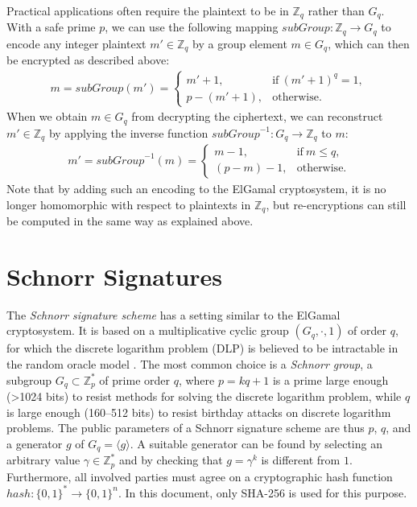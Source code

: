 \documentclass[bibtotoc,halfparskip,oneside]{scrreprt}
\begin{document}
	Practical applications often require the plaintext to be in $\mathbb{Z}_q$ rather than $G_q$. With a safe prime $p$, we can use the following mapping $\mathit{subGroup}:\mathbb{Z}_q\rightarrow G_q$ to encode any integer plaintext $m'\in\mathbb{Z}_q$ by a group element $m\in G_q$, which can then be encrypted as described above:
	\begin{align}
		m=\mathit{subGroup}(m')=
		\begin{cases}
			m'+1,&  \text{if}~ (m'+1)^q=1,\\
			p-(m'+1),&  \text{otherwise}.
		\end{cases}
	\end{align}
	When we obtain $m\in G_q$ from decrypting the ciphertext, we can reconstruct $m'\in\mathbb{Z}_q$ by applying the inverse function $\mathit{subGroup}^{-1}:G_q \rightarrow \mathbb{Z}_q$ to $m$:
	\begin{align}
		m'=\mathit{subGroup}^{-1}(m)=
		\begin{cases}
			m-1,&  \text{if}~ m \leq q,\\
			(p-m)-1,&  \text{otherwise}.
		\end{cases}
	\end{align}
	Note that by adding such an encoding to the ElGamal cryptosystem, it is no longer homomorphic with respect to plaintexts in $\mathbb{Z}_q$, but re-encryptions can still be computed in the same way as explained above.
	
	\section{Schnorr Signatures}\label{schnorrsig}
	
	The \emph{Schnorr signature scheme} has a setting similar to the ElGamal cryptosystem. It is based on a multiplicative cyclic group $(G_q,\cdot,1)$ of order $q$, for which the discrete logarithm problem (DLP) is believed to be intractable in the random oracle model \cite{schnorr91}. The most common choice is a \emph{Schnorr group}, a subgroup $G_q\subset\mathbb{Z}_p^*$ of prime order $q$, where $p=kq+1$ is a  prime large enough (>1024 bits) to resist methods for solving the discrete logarithm problem, while $q$ is large enough (160--512 bits) to resist birthday attacks on discrete logarithm problems. The public parameters of a Schnorr signature scheme are thus $p$, $q$, and a generator $g$ of $G_q=\langle g\rangle$. A suitable generator can be found by selecting an arbitrary value $\gamma\in\mathbb{Z}_p^*$ and by checking that $g=\gamma^k$ is different from $1$. Furthermore, all involved parties must agree on a cryptographic hash function $\mathit{hash}:\{0,1\}^*\rightarrow \{0,1\}^n$. In this document, only SHA-256 is used for this purpose.
	
\end{document}
